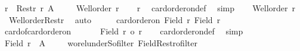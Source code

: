 \begin{isabellebody}
\ {\isacharquery}{\kern0pt}r{\isacharprime}{\kern0pt}\ {\isacharequal}{\kern0pt}\ {\isachardoublequoteopen}Restr\ r\ {\isacharquery}{\kern0pt}A{\isachardoublequoteclose}\isanewline
\ \ \isamarkupfalse%
\ {}{\isacharcolon}{\kern0pt}\ {\isachardoublequoteopen}Well{\isacharunderscore}{\kern0pt}order\ r{\isachardoublequoteclose}\isanewline
\ \ \isamarkupfalse%
\ r\ \isamarkupfalse%
\ card{\isacharunderscore}{\kern0pt}order{\isacharunderscore}{\kern0pt}on{\isacharunderscore}{\kern0pt}def\ \isamarkupfalse%
\ simp\isanewline
\ \ \isamarkupfalse%
\ {\isachardoublequoteopen}Well{\isacharunderscore}{\kern0pt}order\ {\isacharquery}{\kern0pt}r{\isacharprime}{\kern0pt}{\isachardoublequoteclose}\ \isamarkupfalse%
\ {}\ Well{\isacharunderscore}{\kern0pt}order{\isacharunderscore}{\kern0pt}Restr\ \isamarkupfalse%
\ auto\isanewline
\ \ \isamarkupfalse%
\ \isamarkupfalse%
\ {\isachardoublequoteopen}card{\isacharunderscore}{\kern0pt}order{\isacharunderscore}{\kern0pt}on\ {\isacharparenleft}{\kern0pt}Field\ {\isacharquery}{\kern0pt}r{\isacharprime}{\kern0pt}{\isacharparenright}{\kern0pt}\ {\isacharbar}{\kern0pt}Field\ {\isacharquery}{\kern0pt}r{\isacharprime}{\kern0pt}{\isacharbar}{\kern0pt}{\isachardoublequoteclose}\isanewline
\ \ \isamarkupfalse%
\ card{\isacharunderscore}{\kern0pt}of{\isacharunderscore}{\kern0pt}card{\isacharunderscore}{\kern0pt}order{\isacharunderscore}{\kern0pt}on\ \isacommand{{\isachardot}{\kern0pt}}\isamarkupfalse%
\isanewline
\ \ \isamarkupfalse%
\ \isamarkupfalse%
\ {\isachardoublequoteopen}{\isacharbar}{\kern0pt}Field\ {\isacharquery}{\kern0pt}r{\isacharprime}{\kern0pt}{\isacharbar}{\kern0pt}\ {\isasymle}o\ {\isacharquery}{\kern0pt}r{\isacharprime}{\kern0pt}{\isachardoublequoteclose}\isanewline
\ \ \isamarkupfalse%
\ card{\isacharunderscore}{\kern0pt}order{\isacharunderscore}{\kern0pt}on{\isacharunderscore}{\kern0pt}def\ \isamarkupfalse%
\ simp\isanewline
\ \ \isamarkupfalse%
\ \isamarkupfalse%
\ {\isachardoublequoteopen}Field\ {\isacharquery}{\kern0pt}r{\isacharprime}{\kern0pt}\ {\isacharequal}{\kern0pt}\ {\isacharquery}{\kern0pt}A{\isachardoublequoteclose}\isanewline
\ \ \isamarkupfalse%
\ {}\ wo{\isacharunderscore}{\kern0pt}rel{\isachardot}{\kern0pt}underS{\isacharunderscore}{\kern0pt}ofilter\ Field{\isacharunderscore}{\kern0pt}Restr{\isacharunderscore}{\kern0pt}ofilter\isanewline

\end{isabellebody}
